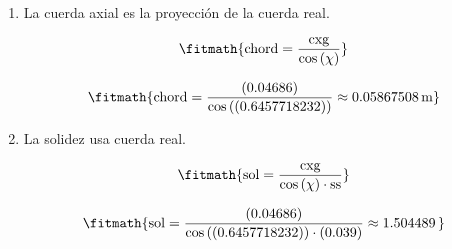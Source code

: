 \begin{enumerate}

\item La cuerda axial es la proyección de la cuerda real.

\[\fitmath{\mathrm{chord}=\frac{\mathrm{cxg}}{\cos\left(\chi\right)}}\]

\[\fitmath{\mathrm{chord}=\frac{(0.04686)}{\cos\left((0.6457718232)\right)}\approx 0.05867508\,\mathrm{m}}\]

\item La solidez usa cuerda real.

\[\fitmath{\mathrm{sol}=\frac{\mathrm{cxg}}{\cos\left(\chi\right)\cdot \mathrm{ss}}}\]

\[\fitmath{\mathrm{sol}=\frac{(0.04686)}{\cos\left((0.6457718232)\right)\cdot (0.039)}\approx 1.504489\,}\]

\end{enumerate}
